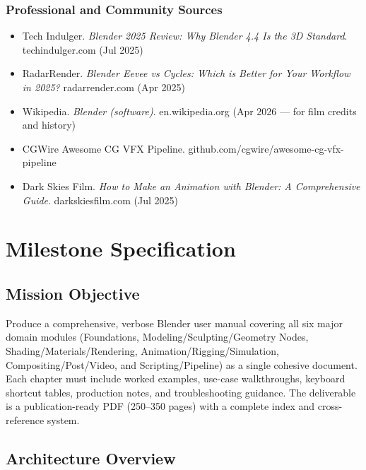\documentclass[11pt,letterpaper]{article}
\newcommand{\stageheader}[2]{%
  \noindent\colorbox{#2}{\makebox[\textwidth][l]{%
    \textcolor{white}{\bfseries\sffamily\hspace{6pt}#1\hspace{6pt}}}}%
  \vspace{0.5em}\par%
}
\begin{document}
\subsubsection{Professional and Community Sources}

\begin{itemize}[leftmargin=2em]
  \item Tech Indulger. \textit{Blender 2025 Review: Why Blender 4.4 Is the 3D Standard}. techindulger.com (Jul 2025)
  \item RadarRender. \textit{Blender Eevee vs Cycles: Which is Better for Your Workflow in 2025?} radarrender.com (Apr 2025)
  \item Wikipedia. \textit{Blender (software)}. en.wikipedia.org (Apr 2026 --- for film credits and history)
  \item CGWire Awesome CG VFX Pipeline. github.com/cgwire/awesome-cg-vfx-pipeline
  \item Dark Skies Film. \textit{How to Make an Animation with Blender: A Comprehensive Guide}. darkskiesfilm.com (Jul 2025)
\end{itemize}

\newpage
\stageheader{STAGE 3 --- MISSION PACKAGE}{tertiary}

\section{Milestone Specification}

\subsection{Mission Objective}

Produce a comprehensive, verbose Blender user manual covering all six major domain modules (Foundations, Modeling/Sculpting/Geometry Nodes, Shading/Materials/Rendering, Animation/Rigging/Simulation, Compositing/Post/Video, and Scripting/Pipeline) as a single cohesive document. Each chapter must include worked examples, use-case walkthroughs, keyboard shortcut tables, production notes, and troubleshooting guidance. The deliverable is a publication-ready PDF (250--350 pages) with a complete index and cross-reference system.

\subsection{Architecture Overview}
\end{document}
